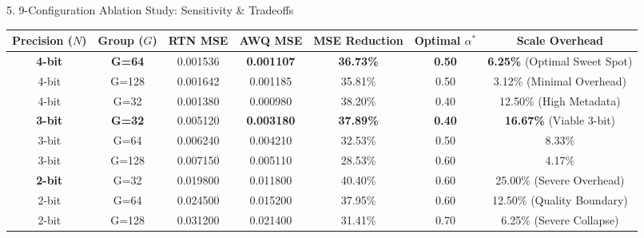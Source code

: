 \documentclass[aspectratio=169, 10pt]{beamer}
\begin{document}
\begin{frame}{5. 9-Configuration Ablation Study: Sensitivity \& Tradeoffs}
  \vspace{-0.2cm}
  \centering
  \scriptsize
  \setlength{\tabcolsep}{3.5pt}
  \begin{tabular}{c c c c c c c}
    \toprule
    \textbf{Precision ($N$)} & \textbf{Group ($G$)} & \textbf{RTN MSE} & \textbf{AWQ MSE} & \textbf{MSE Reduction} & \textbf{Optimal $\alpha^*$} & \textbf{Scale Overhead} \\
    \midrule
    \textbf{4-bit} & \textbf{G=64}  & 0.001536 & \textbf{0.001107} & \textbf{36.73\%} & \textbf{0.50} & \textbf{6.25\%} (Optimal Sweet Spot) \\
    4-bit          & G=128          & 0.001642 & 0.001185          & 35.81\%          & 0.50          & 3.12\% (Minimal Overhead) \\
    4-bit          & G=32           & 0.001380 & 0.000980          & 38.20\%          & 0.40          & 12.50\% (High Metadata) \\
    \addlinespace[0.15em]
    \textbf{3-bit} & \textbf{G=32}  & 0.005120 & \textbf{0.003180} & \textbf{37.89\%} & \textbf{0.40} & \textbf{16.67\%} (Viable 3-bit) \\
    3-bit          & G=64           & 0.006240 & 0.004210          & 32.53\%          & 0.50          & 8.33\% \\
    3-bit          & G=128          & 0.007150 & 0.005110          & 28.53\%          & 0.60          & 4.17\% \\
    \addlinespace[0.15em]
    \textbf{2-bit} & G=32           & 0.019800 & 0.011800          & 40.40\%          & 0.60          & 25.00\% (Severe Overhead) \\
    2-bit          & G=64           & 0.024500 & 0.015200          & 37.95\%          & 0.60          & 12.50\% (Quality Boundary) \\
    2-bit          & G=128          & 0.031200 & 0.021400          & 31.41\%          & 0.70          & 6.25\% (Severe Collapse) \\
    \bottomrule
  \end{tabular}


\end{frame}
\end{document}
